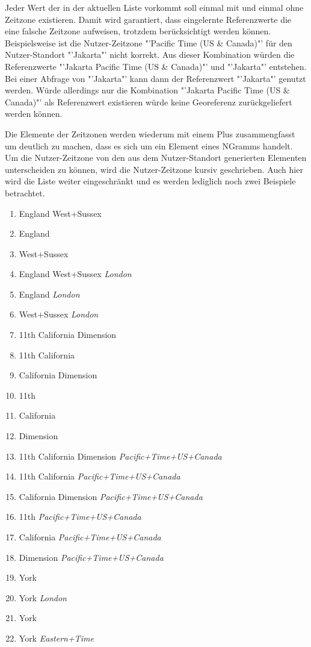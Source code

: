 				Jeder Wert der in der aktuellen Liste vorkommt soll einmal mit und einmal ohne Zeitzone existieren. 
				Damit wird garantiert, dass eingelernte Referenzwerte die eine falsche Zeitzone aufweisen, trotzdem berücksichtigt werden können. 
				Beispielsweise ist die Nutzer-Zeitzone "'Pacific Time (US \& Canada)"' für den Nutzer-Standort "'Jakarta"' nicht korrekt.
				Aus dieser Kombination würden die Referenzwerte "'Jakarta Pacific Time (US \& Canada)"' und "'Jakarta"' entstehen. 
				Bei einer Abfrage von "'Jakarta"' kann dann der Referenzwert "'Jakarta"' genutzt werden. 
				Würde allerdings nur die Kombination "'Jakarta Pacific Time (US \& Canada)"' als Referenzwert existieren würde keine Georeferenz zurückgeliefert werden können.

				Die Elemente der Zeitzonen werden wiederum mit einem Plus zusammengfasst um deutlich zu machen, dass es sich um ein Element eines NGramms handelt.
				Um die Nutzer-Zeitzone von den aus dem Nutzer-Standort generierten Elementen unterscheiden zu können, wird die Nutzer-Zeitzone kursiv geschrieben.
				Auch hier wird die Liste weiter eingeschränkt und es werden lediglich noch zwei Beispiele betrachtet.
				\begin{multicols}{2}
					\begin{enumerate}
						\item England West+Sussex
						\item  England  
						\item  West+Sussex  
						\item  England    West+Sussex   \textit{London}
						\item  England   \textit{London}
						\item  West+Sussex   \textit{London}
						\item  11th    California    Dimension    
						\item  11th    California  
						\item  California    Dimension   
						\item  11th  
						\item  California  
						\item  Dimension   
						\item  11th  California    Dimension   \textit{Pacific+Time+US+Canada}
						\item  11th    California   \textit{Pacific+Time+US+Canada}
						\item  California    Dimension   \textit{Pacific+Time+US+Canada}
						\item  11th   \textit{Pacific+Time+US+Canada}
						\item  California   \textit{Pacific+Time+US+Canada}
						\item  Dimension   \textit{Pacific+Time+US+Canada}
						\item York
						\item  York   \textit{London}
						\item York
						\item  York   \textit{Eastern+Time}
					\end{enumerate}	
				\end{multicols}

